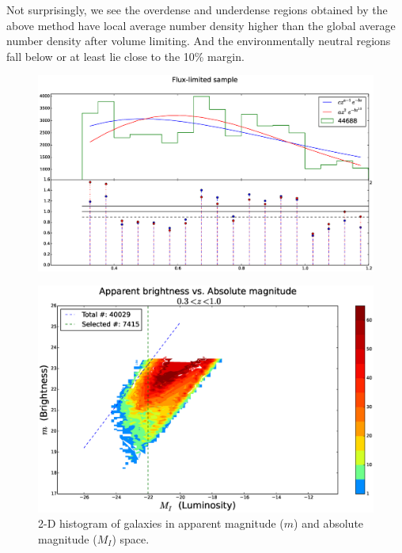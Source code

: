 \documentclass[twocolumn,useAMS,usenatbib]{mn2e}
\begin{document}
Not surprisingly, we see the overdense and underdense regions obtained by the above method have local average number density higher than the global average number density after volume limiting. %
And the environmentally neutral regions fall below or at least lie close to the 10\% margin.

\begin{figure}
 \centering
  \includegraphics[width=\columnwidth]{redshift_fluxlimited}
  \label{fig:redshift_fluxlimited}
  \caption{}
\end{figure}


\begin{figure}
  \centering
   \includegraphics[width=\columnwidth]{hist2d_mag_mi}
   \caption{2-D histogram of galaxies in apparent magnitude ($m$) and absolute magnitude ($M_I$) space.}
   \label{fig:2Dhist}
 \end{figure}
  
\end{document}
